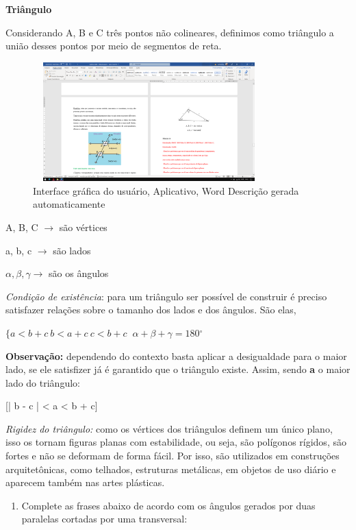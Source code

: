 \textbf{{Triângulo}}

Considerando A, B e C três pontos não colineares, definimos como
triângulo a união desses pontos por meio de segmentos de reta.

\begin{figure}
\centering
\includegraphics[width=3.53174in,height=1.806in]{./imgSAEB_7_MAT/media/image41.png}
\caption{Interface gráfica do usuário, Aplicativo, Word Descrição gerada
automaticamente}
\end{figure}

A, B, C \(\rightarrow\) são vértices

a, b, c \(\rightarrow\) são lados

\(\alpha,\beta,\gamma \rightarrow\) são os ângulos

\emph{Condição de existência}: para um triângulo ser possível de
construir é preciso satisfazer relações sobre o tamanho dos lados e dos
ângulos. São elas,

\(\{ a < b + c\ b < a + c\ c < b + c\ \)
\(\alpha + \beta + \gamma = 180{^\circ}\)

\textbf{Observação:} dependendo do contexto basta aplicar a desigualdade
para o maior lado, se ele satisfizer já é garantido que o triângulo
existe. Assim, sendo \textbf{{a}} o maior lado do triângulo:

[\left| b - c \right| < a < b + c]

\emph{Rigidez do triângulo:} como os vértices dos triângulos definem um
único plano, isso os tornam figuras planas com estabilidade, ou seja,
são polígonos rígidos, são fortes e não se deformam de forma fácil. Por
isso, são utilizados em construções arquitetônicas, como telhados,
estruturas metálicas, em objetos de uso diário e aparecem também nas
artes plásticas.


\begin{enumerate}
\def\labelenumi{\arabic{enumi})}
\tightlist
\item
  Complete as frases abaixo de acordo com os ângulos gerados por duas
  paralelas cortadas por uma transversal:
\end{enumerate}

